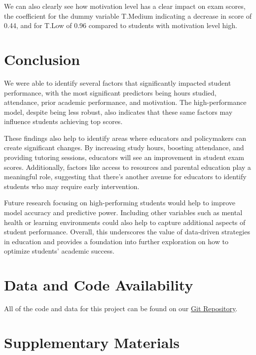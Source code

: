 \documentclass[twocolumn]{article} %
\begin{document}
We can also clearly see how motivation level has a clear impact on exam scores, the coefficient for the dummy variable T.Medium indicating a decrease in score of 0.44, and for T.Low of 0.96 compared to students with motivation level high.


\section{Conclusion}

We were able to identify several factors that significantly impacted student performance, with the most significant predictors being hours studied, attendance, prior academic performance, and motivation. The high-performance model, despite being less robust, also indicates that these same factors may influence students achieving top scores. 

These findings also help to identify areas where educators and policymakers can create significant changes. By increasing study hours, boosting attendance, and providing tutoring sessions, educators will see an improvement in student exam scores. Additionally, factors like access to resources and parental education play a meaningful role, suggesting that there's another avenue for educators to identify students who may require early intervention. 

Future research focusing on high-performing students would help to improve model accuracy and predictive power. Including other variables such as mental health or learning environments could also help to capture additional aspects of student performance. Overall, this underscores the value of data-driven strategies in education and provides a foundation into further exploration on how to optimize students' academic success.

\section{Data and Code Availability}
All of the code and data for this project can be found on our \href{https://github.com/cztm/linear-regression}{Git Repository}.

\newpage
\onecolumn

\section*{Supplementary Materials}

\renewcommand{\figurename}{Supplementary Figure}
\setcounter{figure}{0}
\end{document}
